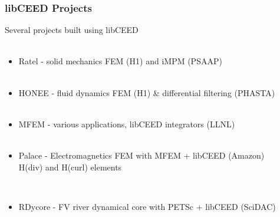\documentclass{beamer}
\begin{document}

\begin{frame}
\begin{center}
\frametitle{libCEED Projects}

Several projects built using libCEED\\

~\\

\begin{itemize}

\item Ratel - solid mechanics FEM (H1) and iMPM (PSAAP)\\

~\\

\item HONEE - fluid dynamics FEM (H1) \& differential filtering (PHASTA)\\

~\\

\item MFEM - various applications, libCEED integrators (LLNL)\\

~\\

\item Palace - Electromagnetics FEM with MFEM + libCEED (Amazon)\\
\hspace{13mm} H(div) and H(curl) elements

~\\

\item RDycore - FV river dynamical core with PETSc + libCEED (SciDAC)\\

\end{itemize}

\end{center}
\end{frame}

\end{document}
